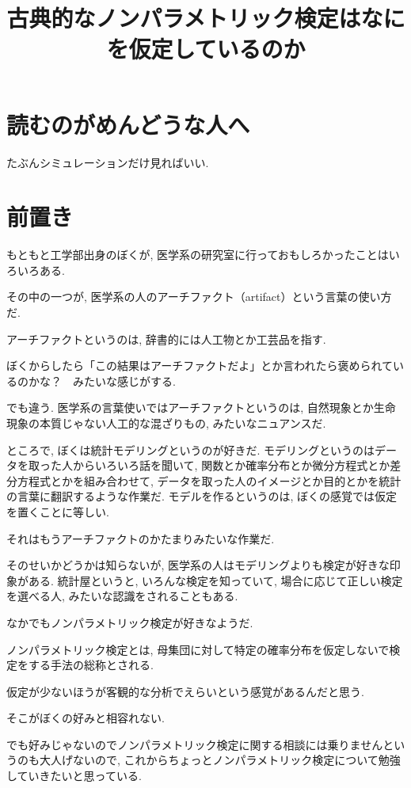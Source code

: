 \documentclass[12pt]{jsarticle}
\title{古典的なノンパラメトリック検定はなにを仮定しているのか}
\author{}
\begin{document}
\maketitle
\tableofcontents

\section{読むのがめんどうな人へ}

たぶんシミュレーションだけ見ればいい. 

\section{前置き}

もともと工学部出身のぼくが, 医学系の研究室に行っておもしろかったことはいろいろある. 

その中の一つが, 医学系の人のアーチファクト（artifact）という言葉の使い方だ. 

アーチファクトというのは, 辞書的には人工物とか工芸品を指す.

ぼくからしたら「この結果はアーチファクトだよ」とか言われたら褒められているのかな？　みたいな感じがする.

でも違う. 医学系の言葉使いではアーチファクトというのは, 自然現象とか生命現象の本質じゃない人工的な混ざりもの, みたいなニュアンスだ.

ところで, ぼくは統計モデリングというのが好きだ. モデリングというのはデータを取った人からいろいろ話を聞いて, 関数とか確率分布とか微分方程式とか差分方程式とかを組み合わせて, データを取った人のイメージとか目的とかを統計の言葉に翻訳するような作業だ. モデルを作るというのは, ぼくの感覚では仮定を置くことに等しい. 

それはもうアーチファクトのかたまりみたいな作業だ.

そのせいかどうかは知らないが, 医学系の人はモデリングよりも検定が好きな印象がある. 統計屋というと, いろんな検定を知っていて, 場合に応じて正しい検定を選べる人, みたいな認識をされることもある.

なかでもノンパラメトリック検定が好きなようだ. 

ノンパラメトリック検定とは, 母集団に対して特定の確率分布を仮定しないで検定をする手法の総称とされる. 

仮定が少ないほうが客観的な分析でえらいという感覚があるんだと思う.

そこがぼくの好みと相容れない. 

でも好みじゃないのでノンパラメトリック検定に関する相談には乗りませんというのも大人げないので, これからちょっとノンパラメトリック検定について勉強していきたいと思っている.
\end{document}
